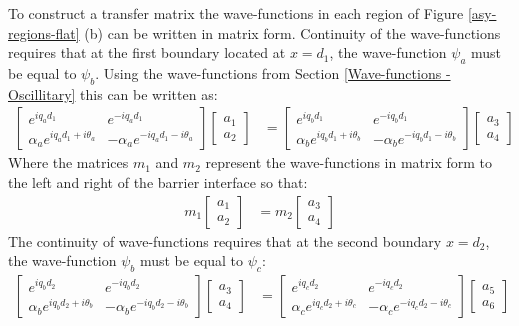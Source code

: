 		To construct a transfer matrix the wave-functions in each region of Figure \ref{asy-regions-flat} (b) can be written in matrix form. Continuity of the wave-functions requires that at the first boundary located at $x=d_{1}$, the wave-function $\psi_{a}$ must be equal to $\psi_{b}$. Using the wave-functions from Section \ref{Wave-functions - Oscillitary} this can be written as:
		\begin{align}
			\left[\begin{array}{ccc}
				e^{iq_{a}d_{1}}&e^{-iq_{a}d_{1}}\\
				\alpha_{a}e^{iq_{a}d_{1}+i\theta_{a}}&-\alpha_{a}e^{-iq_{a}d_{1}-i\theta_{a}}
			\end{array}\right]
			\left[\begin{array}{ccc}
				a_{1}\\
				a_{2}
			\end{array}\right]
			&=
			\left[\begin{array}{ccc}
				e^{iq_{b}d_{1}}&e^{-iq_{b}d_{1}}\\
				\alpha_{b}e^{iq_{b}d_{1}+i\theta_{b}}&-\alpha_{b}e^{-iq_{b}d_{1}-i\theta_{b}}
			\end{array}\right]
			\left[\begin{array}{ccc}
				a_{3}\\
				a_{4}
			\end{array}\right]
		\end{align}
		Where the matrices $m_{1}$ and $m_{2}$ represent the wave-functions in matrix form to the left and right of the barrier interface so that:
		\begin{align}
			m_{1}\left[\begin{array}{ccc}
				a_{1}\\
				a_{2}
			\end{array}\right]
			&=
			m_{2}\left[\begin{array}{ccc}
				a_{3}\\
				a_{4}
			\end{array}\right]
		\end{align}
		The continuity of wave-functions requires that at the second boundary $x=d_{2}$, the wave-function $\psi_{b}$ must be equal to $\psi_{c}$:
		\begin{align}
			\left[\begin{array}{ccc}
				e^{iq_{b}d_{2}}&e^{-iq_{b}d_{2}}\\
				\alpha_{b}e^{iq_{b}d_{2}+i\theta_{b}}&-\alpha_{b}e^{-iq_{b}d_{2}-i\theta_{b}}
			\end{array}\right]
			\left[\begin{array}{ccc}
				a_{3}\\
				a_{4}
			\end{array}\right]
			&=
			\left[\begin{array}{ccc}
				e^{iq_{c}d_{2}}&e^{-iq_{c}d_{2}}\\
				\alpha_{c}e^{iq_{c}d_{2}+i\theta_{c}}&-\alpha_{c}e^{-iq_{c}d_{2}-i\theta_{c}}
			\end{array}\right]
			\left[\begin{array}{ccc}
				a_{5}\\
				a_{6}
			\end{array}\right]
		\end{align}
